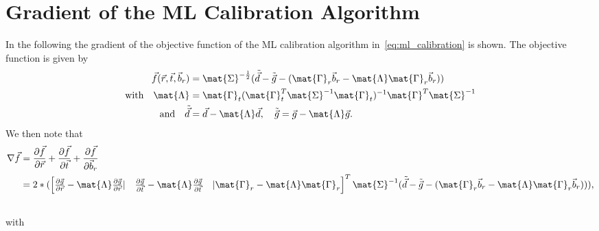 \chapter{Gradient of the ML Calibration Algorithm}\label{sec:appendix_gradient_calibration}
In the following the gradient of the objective function of the ML calibration algorithm in~\eqref{eq:ml_calibration} is shown.
The objective function is given by
\begin{align}
\vec{f}(\vec{r},\vec{t},\vec{b}_r)&=\mat{\Sigma}^{-\frac{1}{2}}(\tilde{\vec{d}} - \tilde{\vec{g}} - (\mat{\Gamma}_r\vec{b}_r - \mat{\Lambda}\mat{\Gamma}_r\vec{b}_r))\\\nonumber
\text{with}\quad\mat{\Lambda} &= \mat{\Gamma}_t(\mat{\Gamma}_t^T\mat{\Sigma}^{-1}\mat{\Gamma}_t)^{-1}\mat{\Gamma}^T\mat{\Sigma}^{-1}\\\nonumber
\text{and}\quad\tilde{\vec{d}} &=\vec{d}-\mat{\Lambda}\vec{d},\quad\tilde{\vec{g}} =\vec{g}-\mat{\Lambda}\vec{g}.
\end{align}
We then note that
\begin{align}
\nabla\vec{f}&=
\frac{\partial\vec{f}}{\partial\vec{r}} + \frac{\partial\vec{f}}{\partial\vec{t}} + \frac{\partial\vec{f}}{\partial\vec{b}_r}\\\nonumber
&=2*(
\begin{bmatrix}
\frac{\partial\vec{g}}{\partial\vec{r}} - \mat{\Lambda}\frac{\partial\vec{g}}{\partial\vec{r}}  |& 
\frac{\partial\vec{g}}{\partial\vec{t}} - \mat{\Lambda}\frac{\partial\vec{g}}{\partial\vec{t}}  &| 
\mat{\Gamma}_r - \mat{\Lambda}\mat{\Gamma}_r
\end{bmatrix}^T
\mat{\Sigma}^{-1}
(\tilde{\vec{d}} - \tilde{\vec{g}} - (\mat{\Gamma}_r\vec{b}_r - \mat{\Lambda}\mat{\Gamma}_r\vec{b}_r))),\\\nonumber
\end{align}
with
